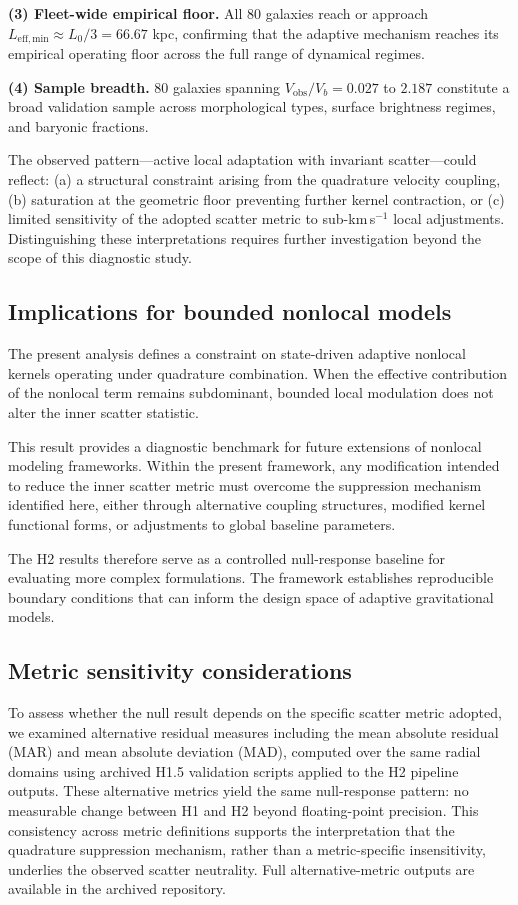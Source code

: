 \documentclass[twocolumn,linenumbers]{aastex701}
\newcommand{\Vobs}{V_{\mathrm{obs}}}
\begin{document}
\textbf{(3) Fleet-wide empirical floor.} All 80 galaxies reach or
approach $L_{\mathrm{eff,min}} \approx L_0/3 = 66.67$ kpc, confirming that
the adaptive mechanism reaches its empirical operating floor across the
full range of dynamical regimes.

\textbf{(4) Sample breadth.} 80 galaxies spanning
$\Vobs/V_b = 0.027$ to $2.187$ constitute a broad validation sample
across morphological types, surface brightness regimes, and baryonic
fractions.

The observed pattern---active local adaptation with invariant scatter---could
reflect: (a) a structural constraint arising from the quadrature velocity
coupling, (b) saturation at the geometric floor preventing further kernel
contraction, or (c) limited sensitivity of the adopted scatter metric to
sub-km\,s$^{-1}$ local adjustments. Distinguishing these interpretations
requires further investigation beyond the scope of this diagnostic study.

\subsection{Implications for bounded nonlocal models}

The present analysis defines a constraint on state-driven adaptive nonlocal
kernels operating under quadrature combination. When the effective
contribution of the nonlocal term remains subdominant, bounded local
modulation does not alter the inner scatter statistic.

This result provides a diagnostic benchmark for future extensions of nonlocal
modeling frameworks. Within the present framework, any modification intended
to reduce the inner scatter metric must overcome the suppression mechanism
identified here, either through alternative coupling structures, modified
kernel functional forms, or adjustments to global baseline parameters.

The H2 results therefore serve as a controlled null-response baseline for
evaluating more complex formulations. The framework establishes reproducible
boundary conditions that can inform the design space of adaptive gravitational
models.

\subsection{Metric sensitivity considerations}
\label{subsec:sensitivity}

To assess whether the null result depends on the specific scatter metric
adopted, we examined alternative residual measures including the mean
absolute residual (MAR) and mean absolute deviation (MAD), computed over
the same radial domains using archived H1.5 validation scripts applied to
the H2 pipeline outputs. These alternative metrics yield the same
null-response pattern: no measurable change between H1 and H2 beyond
floating-point precision. This consistency across metric definitions
supports the interpretation that the quadrature suppression mechanism,
rather than a metric-specific insensitivity, underlies the observed
scatter neutrality. Full alternative-metric outputs are available in
the archived repository.
\end{document}
